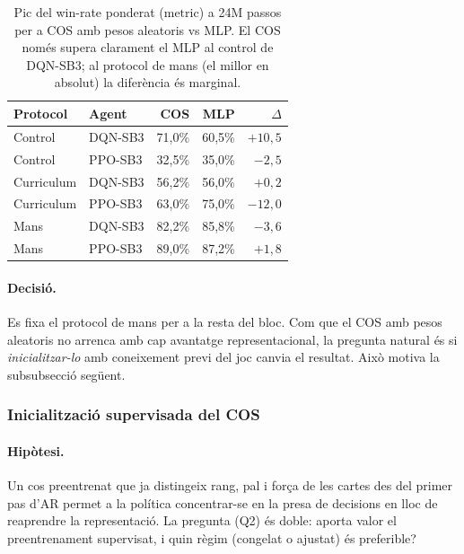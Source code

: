 \begin{table}[H]
  \centering
  \begin{tabular}{llrrr}
    \toprule
    Protocol & Agent & COS & \ac{MLP} & $\Delta$ \\
    \midrule
    Control    & DQN-SB3 & 71{,}0\% & 60{,}5\% & $+10{,}5$ \\
    Control    & PPO-SB3 & 32{,}5\% & 35{,}0\% & $-2{,}5$ \\
    Curriculum & DQN-SB3 & 56{,}2\% & 56{,}0\% & $+0{,}2$ \\
    Curriculum & PPO-SB3 & 63{,}0\% & 75{,}0\% & $-12{,}0$ \\
    Mans       & DQN-SB3 & 82{,}2\% & 85{,}8\% & $-3{,}6$ \\
    Mans       & PPO-SB3 & 89{,}0\% & 87{,}2\% & $+1{,}8$ \\
    \bottomrule
  \end{tabular}
  \caption{Pic del win-rate ponderat (\(\text{metric}\)) a 24M passos per a COS amb pesos
           aleatoris vs \ac{MLP}. El COS només supera clarament el \ac{MLP} al control de
           DQN-SB3; al protocol de mans (el millor en absolut) la diferència és marginal.}
  \label{tab:fase3}
\end{table}

\paragraph{Decisió.} Es fixa el protocol de mans per a la resta del bloc. Com que el COS
amb pesos aleatoris no arrenca amb cap avantatge representacional, la pregunta natural és
si \emph{inicialitzar-lo} amb coneixement previ del joc canvia el resultat. Això motiva la
subsubsecció següent.

\subsubsection{Inicialització supervisada del COS}
\label{sec:fase3-init}

\paragraph{Hipòtesi.} Un cos preentrenat que ja distingeix rang, pal i força de les
cartes des del primer pas d'\ac{AR} permet a la política concentrar-se en la presa de
decisions en lloc de reaprendre la representació. La pregunta (Q2) és doble: aporta valor el
preentrenament supervisat, i quin règim (congelat o ajustat) és preferible?

